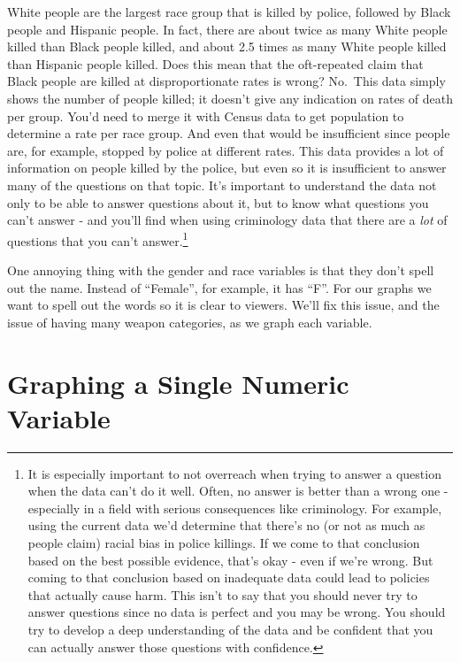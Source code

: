 \documentclass[
  12pt,
]{book}
\begin{document}
White people are the largest race group that is killed by police, followed by Black people and Hispanic people. In fact, there are about twice as many White people killed than Black people killed, and about 2.5 times as many White people killed than Hispanic people killed. Does this mean that the oft-repeated claim that Black people are killed at disproportionate rates is wrong? No.~This data simply shows the number of people killed; it doesn't give any indication on rates of death per group. You'd need to merge it with Census data to get population to determine a rate per race group. And even that would be insufficient since people are, for example, stopped by police at different rates. This data provides a lot of information on people killed by the police, but even so it is insufficient to answer many of the questions on that topic. It's important to understand the data not only to be able to answer questions about it, but to know what questions you can't answer - and you'll find when using criminology data that there are a \emph{lot} of questions that you can't answer.\footnote{It is especially important to not overreach when trying to answer a question when the data can't do it well. Often, no answer is better than a wrong one - especially in a field with serious consequences like criminology. For example, using the current data we'd determine that there's no (or not as much as people claim) racial bias in police killings. If we come to that conclusion based on the best possible evidence, that's okay - even if we're wrong. But coming to that conclusion based on inadequate data could lead to policies that actually cause harm. This isn't to say that you should never try to answer questions since no data is perfect and you may be wrong. You should try to develop a deep understanding of the data and be confident that you can actually answer those questions with confidence.}

One annoying thing with the gender and race variables is that they don't spell out the name. Instead of ``Female'', for example, it has ``F''. For our graphs we want to spell out the words so it is clear to viewers. We'll fix this issue, and the issue of having many weapon categories, as we graph each variable.

\hypertarget{graphing-a-single-numeric-variable}{%
\section{Graphing a Single Numeric Variable}\label{graphing-a-single-numeric-variable}}
\end{document}
